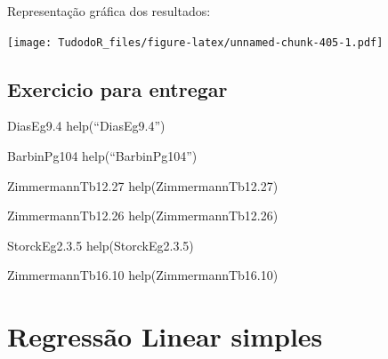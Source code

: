 \documentclass[
]{book}
\newenvironment{Shaded}{\begin{snugshade}}{\end{snugshade}}
\newcommand{\DataTypeTok}[1]{\textcolor[rgb]{0.13,0.29,0.53}{#1}}
\newcommand{\DecValTok}[1]{\textcolor[rgb]{0.00,0.00,0.81}{#1}}
\newcommand{\FloatTok}[1]{\textcolor[rgb]{0.00,0.00,0.81}{#1}}
\newcommand{\KeywordTok}[1]{\textcolor[rgb]{0.13,0.29,0.53}{\textbf{#1}}}
\newcommand{\NormalTok}[1]{#1}
\newcommand{\OperatorTok}[1]{\textcolor[rgb]{0.81,0.36,0.00}{\textbf{#1}}}
\newcommand{\StringTok}[1]{\textcolor[rgb]{0.31,0.60,0.02}{#1}}
\begin{document}
Representação gráfica dos resultados:

\begin{Shaded}
\end{Shaded}

\texttt{[image: TudodoR\_files/figure-latex/unnamed-chunk-405-1.pdf]}

\hypertarget{exercicio-para-entregar}{%
\subsection{Exercicio para entregar}\label{exercicio-para-entregar}}

DiasEg9.4
help(``DiasEg9.4'')

BarbinPg104
help(``BarbinPg104'')

ZimmermannTb12.27
help(ZimmermannTb12.27)

ZimmermannTb12.26
help(ZimmermannTb12.26)

StorckEg2.3.5
help(StorckEg2.3.5)

ZimmermannTb16.10
help(ZimmermannTb16.10)

\hypertarget{regressuxe3o-linear-simples}{%
\section{Regressão Linear simples}\label{regressuxe3o-linear-simples}}
\end{document}
